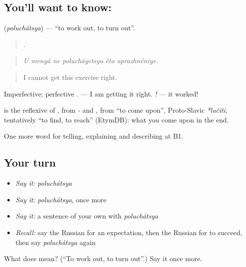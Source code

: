 \subsection*{You'll want to know: }
\textbf{} (\emph{poluchátsya}) — \textquotedblleft{}to work out, to turn out\textquotedblright{}.

\begin{quote}
     .
\end{quote}

\begin{quote}
\emph{U menyá ne polucháyetsya éto uprazhnéniye.}
\end{quote}

\begin{quote}
I cannot get this exercise right.
\end{quote}

Imperfective; perfective \emph{}. \emph{  } — I am getting it right. \emph{!} — it worked!

\begin{cousinweb}
\textbf{} is the reflexive of \emph{}, from \emph{-} and \emph{}, from \emph{} \textquotedblleft{}to come upon\textquotedblright{}, Proto-Slavic \emph{*lučiti}, tentatively \textquotedblleft{}to find, to reach\textquotedblright{} (EtymDB): what you come upon in the end.
\end{cousinweb}

\begin{grammarlens}[title={What you've built}]
One more word for telling, explaining and describing at B1.
\end{grammarlens}

\subsection*{Your turn}
\begin{itemize}
\raggedright
  \item \emph{Say it:} \emph{poluchátsya}
  \item \emph{Say it:} \emph{poluchátsya}, once more
  \item \emph{Say it:} a sentence of your own with \emph{poluchátsya}
  \item \emph{Recall:} say the Russian for an expectation, then the Russian for to succeed, then say \emph{poluchátsya} again
\end{itemize}

\begin{tcolorbox}[breakable,colback=teal!4,colframe=teal!35!black,title={Before you move on}]
What does  mean? (\textquotedblleft{}To work out, to turn out\textquotedblright{}.) Say it once more.
\end{tcolorbox}
